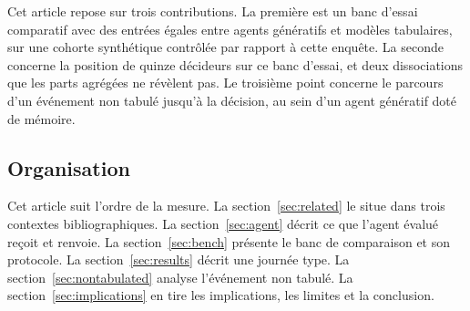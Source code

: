 Cet article repose sur trois contributions. La première est un banc d'essai comparatif avec des entrées égales entre agents génératifs et modèles tabulaires, sur une cohorte synthétique contrôlée par rapport à cette enquête. La seconde concerne la position de quinze décideurs sur ce banc d'essai, et deux dissociations que les parts agrégées ne révèlent pas. Le troisième point concerne le parcours d'un événement non tabulé jusqu'à la décision, au sein d'un agent génératif doté de mémoire.

\subsection{Organisation}
\label{sec:organisation}

Cet article suit l'ordre de la mesure. La section~\ref{sec:related} le situe dans trois contextes bibliographiques. La section~\ref{sec:agent} décrit ce que l'agent évalué reçoit et renvoie. La section~\ref{sec:bench} présente le banc de comparaison et son protocole. La section~\ref{sec:results} décrit une journée type. La section~\ref{sec:nontabulated} analyse l'événement non tabulé. La section~\ref{sec:implications} en tire les implications, les limites et la conclusion.
